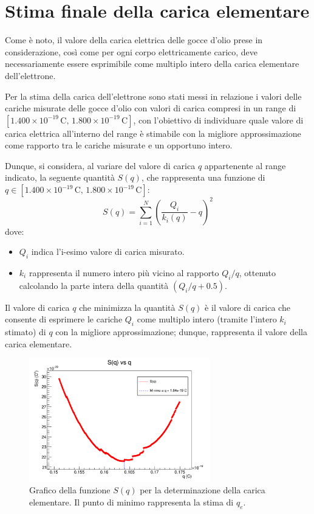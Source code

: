 \documentclass[a4paper,12pt]{article}
\begin{document}
\section{Stima finale della carica elementare}

Come è noto, il valore della carica elettrica delle gocce d’olio prese in considerazione, così come per ogni corpo elettricamente carico, deve necessariamente essere esprimibile come multiplo intero della carica elementare dell’elettrone.

Per la stima della carica dell’elettrone sono stati messi in relazione i valori delle cariche misurate delle gocce d’olio con valori di carica compresi in un range di \([1.400 \times 10^{-19} \, \text{C}, \, 1.800 \times 10^{-19} \, \text{C}]\), con l’obiettivo di individuare quale valore di carica elettrica all’interno del range è stimabile con la migliore approssimazione come rapporto tra le cariche misurate e un opportuno intero.

Dunque, si considera, al variare del valore di carica \( q \) appartenente al range indicato, la seguente quantità \( S(q) \), che rappresenta una funzione di \( q \in [1.400 \times 10^{-19} \, \text{C}, \, 1.800 \times 10^{-19} \, \text{C}] \):
\begin{equation}
S(q) = \sum_{i=1}^{N} \left( \frac{Q_i}{k_i(q)}- q \right)^2
\label{eq:somma_scarti}
\end{equation}
dove:
\begin{itemize}
\item \( Q_i \) indica l’i-esimo valore di carica misurato.
\item \( k_i \) rappresenta il numero intero più vicino al rapporto \( Q_i / q \), ottenuto calcolando la parte intera della quantità \( \left( Q_i / q + 0.5 \right) \).
\end{itemize}

Il valore di carica \( q \) che minimizza la quantità \( S(q) \) è il valore di carica che consente di esprimere le cariche \( Q_i \) come multiplo intero (tramite l’intero \( k_i \) stimato) di \( q \) con la migliore approssimazione; dunque, rappresenta il valore della carica elementare.

\begin{figure}[H]
    \centering
    \includegraphics[width=0.7\textwidth]{GraficoSFunction.png}
    \caption{Grafico della funzione \( S(q) \) per la determinazione della carica elementare. Il punto di minimo rappresenta la stima di \( q_e \).}
    \label{fig:minimo_Sq}
\end{figure}
\end{document}
